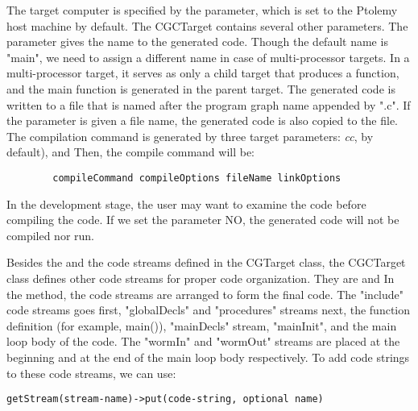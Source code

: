  The target computer is specified by the  
parameter, which is set to the Ptolemy host machine by default.
 The CGCTarget contains several other parameters.
 The
parameter gives the name to the generated code.
  Though the default name is "main", we need to assign a different name
in case of multi-processor targets.
 In a multi-processor target, it serves as only a child target that
produces a function, and the main function is generated in the parent
target.
 The generated code is written to a file that is named after the
program graph name appended by ".c".
  If the  
parameter is given a file name, the generated code is also copied to
the file.
 The compilation command is generated by three target parameters:
\emph{cc}, by default), 
and 
 Then, the compile command will be:

\begin{verbatim}
        compileCommand compileOptions fileName linkOptions
\end{verbatim}

In the development stage, the user may want to examine the code before
compiling the code. If we set the parameter
NO, the generated code will not be compiled nor run.

 Besides the
and the
code streams defined in the CGTarget class, the CGCTarget class
defines other code streams for proper code organization.
 They are
and
 In the
method, the code streams are arranged to form the final code.
 The "include" code streams goes first, "globalDecls" and
"procedures" streams next, the function definition (for example, main()),
"mainDecls" stream, "mainInit", and the main loop body of the code.
  The "wormIn" and "wormOut" streams are placed at the beginning and at
the end of the main loop body respectively.
 To add code strings to these code streams, we can use:

\begin{verbatim}
getStream(stream-name)->put(code-string, optional name)
\end{verbatim}

